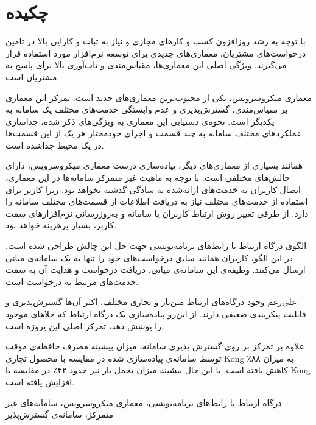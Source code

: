 \section*{چکیده}
با توجه به رشد روز‌افزون کسب و کارهای مجازی و نیاز به ثبات و کارایی بالا در تامین درخواست‌‌های مشتریان، معماری‌های جدیدی برای توسعه نرم‌افزار مورد استفاده قرار می‌گیرند. ویژگی اصلی این معماری‌ها، مقیاس‌مندی و تاب‌آوری بالا برای پاسخ به مشتریان است.

معماری میکروسرویس، یکی از محبوب‌ترین معماری‌های جدید است. تمرکز این معماری بر مقیاس‌مندی، گسترش‌پذیری و عدم وابستگی خدمت‌های مختلف یک سامانه به یکدیگر است. نحوه‌ی دستیابی این معماری به ویژگی‌های ذکر شده، جداسازی عملکرد‌های مختلف سامانه به چند قسمت و اجرای خودمختار هر یک از این قسمت‌ها در یک محیط جدا‌شده
است.

همانند بسیاری از معماری‌های دیگر، پیاده‌سازی درست معماری میکروسرویس، دارای چالش‌های مختلفی است. با توجه به ماهیت غیر متمرکز سامانه‌ها در این معماری، اتصال کاربران به خدمت‌های ارائه‌شده به سادگی گذشته نخواهد بود. زیرا کاربر برای استفاده از خدمت‌های مختلف نیاز به دریافت اطلاعات از قسمت‌های مختلف سامانه را دارد. از طرفی تغییر روش ارتباط کاربران با سامانه و به‌روزرسانی نرم‌افزارهای سمت کاربر، بسیار پرهزینه خواهد بود.

الگوی درگاه ارتباط با رابط‌های برنامه‌نویسی جهت حل این چالش طراحی شده است. در این الگو، کاربران همانند سابق درخواست‌های خود را تنها به یک سامانه‌ی میانی ارسال می‌کنند. وظیفه‌ی این سامانه‌ی میانی، دریافت درخواست و هدایت ‌آن به سمت خدمت‌های مرتبط به درخواست است.

علی‌رغم وجود درگاه‌های ارتباط متن‌باز و تجاری مختلف، اکثر آن‌ها گسترش‌پذیری و قابلیت پیکربندی ضعیفی دارند. از این‌رو پیاده‌سازی یک درگاه ارتباط که خلاهای موجود را پوشش دهد، تمرکز اصلی این پروژه است.

علاوه بر تمرکز بر روی گسترش پذیری سامانه، میزان بیشینه مصرف حافظه‌ی موقت توسط سامانه‌ی پیاده‌سازی شده در مقایسه با محصول تجاری Kong به میزان ۸۸٪ کاهش یافته است. با این حال بیشینه میزان تحمل بار نیز حدود ۴۲٪ در مقایسه با Kong افزایش یافته است.


درگاه ارتباط با رابط‌های برنامه‌نویسی، معماری میکروسرویس، سامانه‌های غیر متمرکز، سامانه‌ی گسترش‌پذیر
\cleardoublepage 